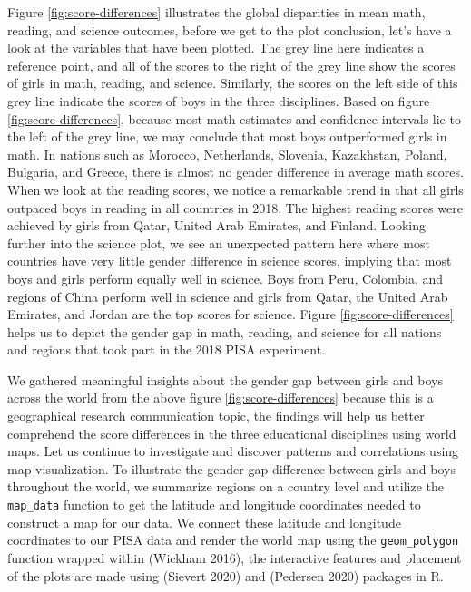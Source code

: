 Figure \ref{fig:score-differences} illustrates the global disparities in mean math, reading, and science outcomes, before we get to the plot conclusion, let's have a look at the variables that have been plotted. The grey line here indicates a reference point, and all of the scores to the right of the grey line show the scores of girls in math, reading, and science. Similarly, the scores on the left side of this grey line indicate the scores of boys in the three disciplines. Based on figure \ref{fig:score-differences}, because most math estimates and confidence intervals lie to the left of the grey line, we may conclude that most boys outperformed girls in math. In nations such as Morocco, Netherlands, Slovenia, Kazakhstan, Poland, Bulgaria, and Greece, there is almost no gender difference in average math scores. When we look at the reading scores, we notice a remarkable trend in that all girls outpaced boys in reading in all countries in 2018. The highest reading scores were achieved by girls from Qatar, United Arab Emirates, and Finland. Looking further into the science plot, we see an unexpected pattern here where most countries have very little gender difference in science scores, implying that most boys and girls perform equally well in science. Boys from Peru, Colombia, and regions of China perform well in science and girls from Qatar, the United Arab Emirates, and Jordan are the top scores for science. Figure \ref{fig:score-differences} helps us to depict the gender gap in math, reading, and science for all nations and regions that took part in the 2018 PISA experiment.

We gathered meaningful insights about the gender gap between girls and boys across the world from the above figure \ref{fig:score-differences} because this is a geographical research communication topic, the findings will help us better comprehend the score differences in the three educational disciplines using world maps. Let us continue to investigate and discover patterns and correlations using map visualization. To illustrate the gender gap difference between girls and boys throughout the world, we summarize regions on a country level and utilize the \texttt{map\_data} function to get the latitude and longitude coordinates needed to construct a map for our data. We connect these latitude and longitude coordinates to our PISA data and render the world map using the \texttt{geom\_polygon} function wrapped within  (Wickham 2016), the interactive features and placement of the plots are made using  (Sievert 2020) and  (Pedersen 2020) packages in R.


